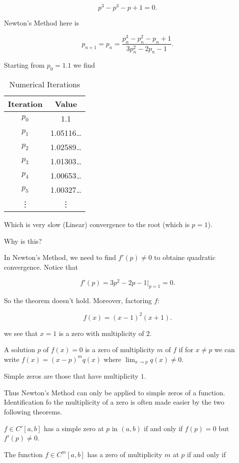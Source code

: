 \[
p^3 - p^3 - p + 1 = 0
.\]

Newton's Method here is

\[
  p_{n+1} = p_n = \frac{p_n^3 - p_n^2 - p_n + 1}{3p_n^2 - 2p_n -1}
.\]

Starting from $p_0 = 1.1$ we find

\begin{table}[h]
  \centering
  \begin{tabular}{c|c}
    \textbf{Iteration} & \textbf{Value} \\
    \hline
    $p_0$ & 1.1 \\
    $p_1$ & 1.05116\ldots \\
    $p_2$ & 1.02589\ldots \\
    $p_3$ & 1.01303\ldots \\
    $p_4$ & 1.00653\ldots \\
    $p_5$ & 1.00327\ldots \\
    \vdots & \vdots
  \end{tabular}
  \caption{Numerical Iterations}
  \label{tab:iterations}
\end{table}

Which is very slow (Linear) convergence to the root (which is $p=1$).

Why is this?

In Newton's Method, we need to find $f'(p) \neq 0 $ to obtaine quadratic 
convergence. Notice that

\[
  f'(p) = 3p^2 - 2p - 1 |_{p=1} = 0
.\]

So the theorem doesn't hold. Moreover, factoring $f$:

\[
f(x) = (x-1)^2(x+1)
.\]

we see that $x=1$ is a zero with multiplicity of $2$.

 A solution $p$ of $f(x) = 0$ is a zero of multiplicity $m$ of $f$ if for 
$x\ne p$ we can write $f(x) = (x-p)^m q(x)$ where $\lim_{x\to p} q(x) \neq 0$.

Simple zeros are those that have multiplicity $1$.

Thus Newton's Method can only be applied to simple zeros of a function.
Identification fo the multiplicity of a zero is often made easier by the two
following theorems.


$f\in C'[a,b]$ has a simple zero at $p$ in $(a,b)$ if and only if $f(p) = 0$
but $f'(p) \neq 0$.


The function $f\in C^m[a,b]$ has a zero of multiplicity $m$ at $p$ if and only
if 

